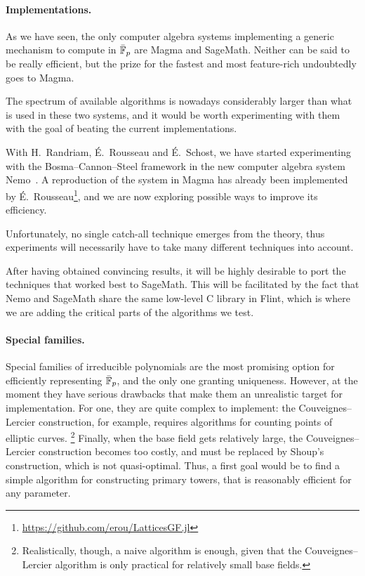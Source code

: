 \documentclass[b5layout]{hdr}
\begin{document}
\paragraph{Implementations.}
As we have seen, the only computer algebra systems implementing a
generic mechanism to compute in $\bar{\mathbb{F}}_p$ are Magma and SageMath. %
Neither can be said to be really efficient, but the prize for the
fastest and most feature-rich undoubtedly goes to Magma. %

The spectrum of available algorithms is nowadays considerably larger
than what is used in these two systems, and it would be worth
experimenting with them with the goal of beating the current
implementations. %

With H.~Randriam, É.~Rousseau and É.~Schost, we have started
experimenting with the Bosma--Cannon--Steel framework in the new
computer algebra system Nemo~\cite{Fieker:2017:NCA:3087604.3087611}. %
A reproduction of the system in Magma has already been implemented by
É.~Rousseau\footnote{\url{https://github.com/erou/LatticesGF.jl}}, and
we are now exploring possible ways to improve its efficiency. %

Unfortunately, no single catch-all technique emerges from the theory,
thus experiments will necessarily have to take many different
techniques into account. %

After having obtained convincing results, it will be highly desirable
to port the techniques that worked best to SageMath. %
This will be facilitated by the fact that Nemo and SageMath share the
same low-level C library in Flint, which is where we are adding the
critical parts of the algorithms we test. %

\paragraph{Special families.}
Special families of irreducible polynomials are the most promising
option for efficiently representing $\bar{\mathbb{F}}_p$, and the only one
granting uniqueness. %
However, at the moment they have serious drawbacks that make them an
unrealistic target for implementation. %
For one, they are quite complex to implement: the Couveignes--Lercier
construction, for example, requires algorithms for counting points of
elliptic curves.%
\footnote{Realistically, though, a naive algorithm is enough, given
  that the Couveignes--Lercier algorithm is only practical for
  relatively small base fields.} %
Finally, when the base field gets relatively large, the
Couveignes--Lercier construction becomes too costly, and must be
replaced by Shoup's construction, which is not quasi-optimal. %
Thus, a first goal would be to find a simple algorithm for
constructing primary towers, that is reasonably efficient for any
parameter. %
\end{document}
